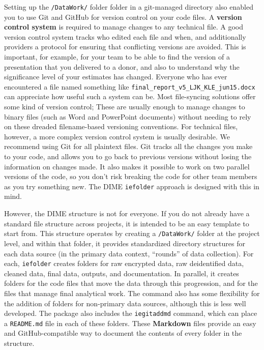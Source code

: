 Setting up the \texttt{/DataWork/} folder folder in a git-managed directory
also enabled you to use Git and GitHub for version control on your code files.
A \textbf{version control system} is required to manage changes to any technical file.
A good version control system tracks who edited each file and when,
and additionally providers a protocol for ensuring that conflicting versions are avoided.
This is important, for example, for your team to be able to find the version of a presentation that you delivered to a donor,
and also to understand why the significance level of your estimates has changed.
Everyone who has ever encountered a file named something like \texttt{final\_report\_v5\_LJK\_KLE\_jun15.docx}
can appreciate how useful such a system can be.
Most file-syncing solutions offer some kind of version control;
These are usually enough to manage changes to binary files (such as Word and PowerPoint documents)
without needing to rely on these dreaded filename-based versioning conventions.
For technical files, however, a more complex version control system is usually desirable.
We recommend using Git
for all plaintext files.
Git tracks all the changes you make to your code,
and allows you to go back to previous versions without losing the information on changes made.
It also makes it possible to work on two parallel versions of the code,
so you don't risk breaking the code for other team members as you try something new.
The DIME \texttt{iefolder} approach is designed with this in mind.

However, the DIME structure is not for everyone.
If you do not already have a standard file structure across projects,
it is intended to be an easy template to start from.
This structure operates by creating a \texttt{/DataWork/} folder at the project level,
and within that folder, it provides standardized directory structures
for each data source (in the primary data context, ``rounds'' of data collection).
For each, \texttt{iefolder} creates folders for raw encrypted data,
raw deidentified data, cleaned data, final data, outputs, and documentation.
In parallel, it creates folders for the code files
that move the data through this progression,
and for the files that manage final analytical work.
The command also has some flexibility for the addition of
folders for non-primary data sources, although this is less well developed.
The package also includes the \texttt{iegitaddmd} command,
which can place a \texttt{README.md} file in each of these folders.
These \textbf{Markdown} files provide an easy and GitHub-compatible way
to document the contents of every folder in the structure.

